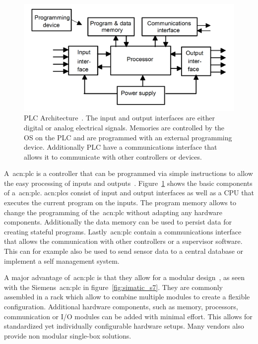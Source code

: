 \begin{figure}
    \includegraphics[width=\textwidth]{Figures/PLC_Architecture.png}
    \caption[PLC Architecture]{
       PLC Architecture~\cite[p.~4]{BOLTON200653}.
    The input and output interfaces are either digital or analog electrical signals.
    Memories are controlled by the OS on the PLC and are programmed with an external programming device.
    Additionally PLC have a communications interface that allows it to communicate with other controllers or devices.}
    \label{fig:plc_architecture}
\end{figure}

A~\acrfull{acn:plc} is a controller that can be programmed via simple instructions to allow the easy processing of inputs and outputs~\cite[p.~4]{BOLTON200653}.
Figure~\ref{fig:plc_architecture} shows the basic components of a~\acrshort{acn:plc}.
\acrshort{acn:plc}s consist of input and output interfaces as well as a CPU that executes the current program on the inputs.
The program memory allows to change the programming of  the~\acrshort{acn:plc} without adapting any hardware components.
Additionally the data memory can be used to persist data for creating stateful programs.
Lastly~\acrshort{acn:plc} contain a communications interface that allows the communication with other controllers or a supervisor software.
This can for example also be used to send sensor data to a central database or implement a self management system.

A major advantage of~\acrshort{acn:plc} is that they allow for a modular design~\cite[p.~12]{BOLTON200653}, as seen with the Siemens~\acrshort{acn:plc} in figure~\ref{fig:simatic_s7}.
They are commonly assembled in a rack which allow to combine multiple modules to create a flexible configuration.
Additional hardware components, such as memory, processors, communication or I/O modules can be added with minimal effort.
This allows for standardized yet individually configurable hardware setups.
Many vendors also provide non modular single-box solutions.

